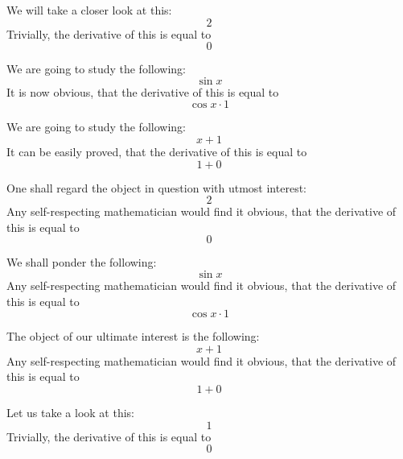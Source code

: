 \documentclass{article}
\begin{document}
We will take a closer look at this:
\begin{equation}
2 
\end{equation}
Trivially, the derivative of this is equal to
\begin{equation}
0 
\end{equation}

We are going to study the following:
\begin{equation}
\sin x 
\end{equation}
It is now obvious, that the derivative of this is equal to
\begin{equation}
\cos x \cdot 1 
\end{equation}

We are going to study the following:
\begin{equation}
x + 1 
\end{equation}
It can be easily proved, that the derivative of this is equal to
\begin{equation}
1 + 0 
\end{equation}

One shall regard the object in question with utmost interest:
\begin{equation}
2 
\end{equation}
Any self-respecting mathematician would find it obvious, that the derivative of this is equal to
\begin{equation}
0 
\end{equation}

We shall ponder the following:
\begin{equation}
\sin x 
\end{equation}
Any self-respecting mathematician would find it obvious, that the derivative of this is equal to
\begin{equation}
\cos x \cdot 1 
\end{equation}

The object of our ultimate interest is the following:
\begin{equation}
x + 1 
\end{equation}
Any self-respecting mathematician would find it obvious, that the derivative of this is equal to
\begin{equation}
1 + 0 
\end{equation}

Let us take a look at this:
\begin{equation}
1 
\end{equation}
Trivially, the derivative of this is equal to
\begin{equation}
0 
\end{equation}
\end{document}
